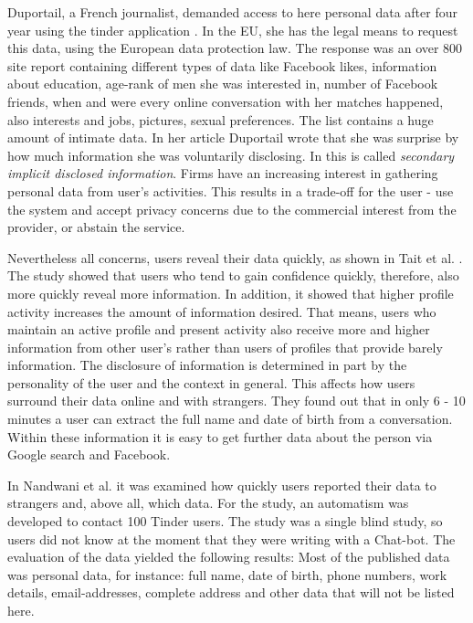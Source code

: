 Duportail, a French journalist, demanded access to here personal data after four year using the tinder application \cite{taylor2009privacy}. In the \acs{EU}, she has the legal means to request this data, using the European data protection law. The response was an over 800 site report containing different types of data like Facebook likes, information about education, age-rank of men she was interested in, number of Facebook friends, when and were every online conversation with her matches happened, also interests and jobs, pictures, sexual preferences. The list contains a huge amount of intimate data. In her article Duportail wrote that she was surprise by how much information she was voluntarily disclosing.
In \cite{taylor2009privacy} this is called \textit{secondary implicit disclosed information}. Firms have an increasing interest in gathering personal data from user's activities. This results in a trade-off for the user - use the system and accept privacy concerns due to the commercial interest from the provider, or abstain the service.

Nevertheless all concerns, users reveal their data quickly, as shown in Tait et al. \cite{tait2015hello}. 
The study showed that users who tend to gain confidence quickly, therefore, also more quickly reveal more information. In addition, it showed that higher profile activity increases the amount of information desired. 
That means, users who maintain an active profile and present activity also receive more and higher information from other user's rather than users of profiles that provide barely information. The disclosure of information is determined in part by the personality of the user and the context in general. This affects how users surround their data online and with strangers. They found out that in only 6 - 10 minutes a user can extract the full name and date of birth from a conversation. Within these information it is easy to get further data about the person via Google search and Facebook.

In Nandwani et al. \cite{10.1007/978-3-319-61542-4_32} it was examined how quickly users reported their data to strangers and, above all, which data. For the study, an automatism was developed to contact 100 Tinder users. The study was a single blind study, so users did not know at the moment that they were writing with a Chat-bot. The evaluation of the data yielded the following results: Most of the published data was personal data, for instance: full name, date of birth, phone numbers, work details, email-addresses, complete address and other data that will not be listed here.

